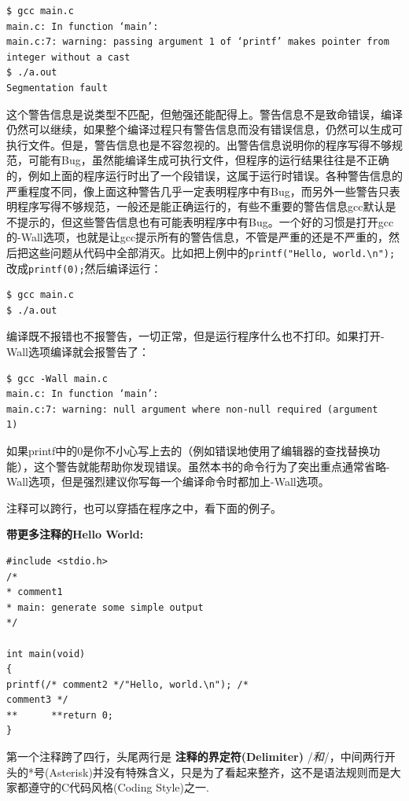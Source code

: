 \documentclass[12pt]{book}
\begin{document}
\begin{verbatim}
$ gcc main.c
main.c: In function ‘main’:
main.c:7: warning: passing argument 1 of ‘printf’ makes pointer from
integer without a cast
$ ./a.out
Segmentation fault
\end{verbatim}

这个警告信息是说类型不匹配，但勉强还能配得上。警告信息不是致命错误，编译仍然可以继续，如果整个编译过程只有警告信息而没有错误信息，仍然可以生成可执行文件。但是，警告信息也是不容忽视的。出警告信息说明你的程序写得不够规范，可能有Bug，虽然能编译生成可执行文件，但程序的运行结果往往是不正确的，例如上面的程序运行时出了一个段错误，这属于运行时错误。各种警告信息的严重程度不同，像上面这种警告几乎一定表明程序中有Bug，而另外一些警告只表明程序写得不够规范，一般还是能正确运行的，有些不重要的警告信息gcc默认是不提示的，但这些警告信息也有可能表明程序中有Bug。一个好的习惯是打开gcc的-Wall选项，也就是让gcc提示所有的警告信息，不管是严重的还是不严重的，然后把这些问题从代码中全部消灭。比如把上例中的\texttt{printf("Hello,\ world.\textbackslash{}n");}改成\texttt{printf(0);}然后编译运行：

\begin{verbatim}
$ gcc main.c
$ ./a.out
\end{verbatim}

编译既不报错也不报警告，一切正常，但是运行程序什么也不打印。如果打开-Wall选项编译就会报警告了：

\begin{verbatim}
$ gcc -Wall main.c
main.c: In function ‘main’:
main.c:7: warning: null argument where non-null required (argument
1)
\end{verbatim}

如果printf中的0是你不小心写上去的（例如错误地使用了编辑器的查找替换功能），这个警告就能帮助你发现错误。虽然本书的命令行为了突出重点通常省略-Wall选项，但是强烈建议你写每一个编译命令时都加上-Wall选项。

注释可以跨行，也可以穿插在程序之中，看下面的例子。

\textbf{带更多注释的Hello World:}
\begin{verbatim}
#include <stdio.h>
/*
* comment1
* main: generate some simple output
*/

int main(void)
{
printf(/* comment2 */"Hello, world.\n"); /*
comment3 */
**		**return 0;
}
\end{verbatim}

第一个注释跨了四行，头尾两行是 \textbf{注释的界定符(Delimiter)}
/\emph{和}/，中间两行开头的*号(Asterisk)并没有特殊含义，只是为了看起来整齐，这不是语法规则而是大家都遵守的C代码风格(Coding
Style)之一.
\end{document}
